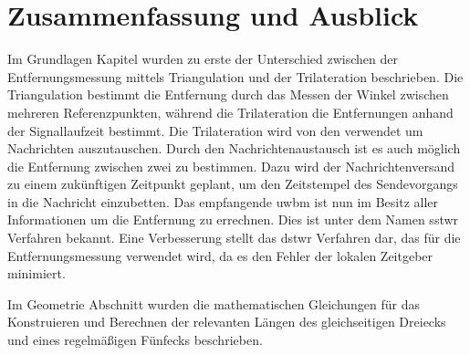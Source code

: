 %
%	
%	
%
\chapter{Zusammenfassung und Ausblick}

Im Grundlagen Kapitel wurden zu erste der Unterschied zwischen der Entfernungsmessung mittels Triangulation und der Trilateration beschrieben. Die Triangulation bestimmt die Entfernung durch das Messen der Winkel zwischen mehreren Referenzpunkten, während die Trilateration die Entfernungen anhand der Signallaufzeit bestimmt. Die Trilateration wird von den  verwendet um Nachrichten auszutauschen. Durch den Nachrichtenaustausch ist es auch möglich die Entfernung zwischen zwei  zu bestimmen. Dazu wird der Nachrichtenversand zu einem zukünftigen Zeitpunkt geplant, um den Zeitstempel des Sendevorgangs in die Nachricht einzubetten. Das empfangende \gls{uwbm} ist nun im Besitz aller Informationen um die Entfernung zu errechnen. Dies ist unter dem Namen \gls{sstwr} Verfahren bekannt. Eine Verbesserung stellt das \gls{dstwr} Verfahren dar, das für die Entfernungsmessung verwendet wird, da es den Fehler der lokalen Zeitgeber minimiert.

Im Geometrie Abschnitt wurden die mathematischen Gleichungen für das Konstruieren und Berechnen der relevanten Längen des gleichseitigen Dreiecks und eines regelmäßigen Fünfecks beschrieben.

